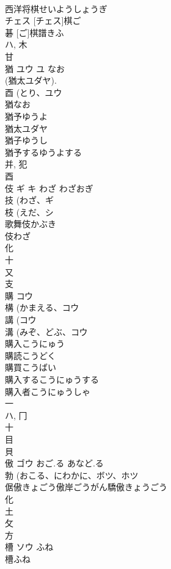\documentclass[8pt]{extreport}
\begin{document}
\begin{CJK}{UTF8}{min}
\\	西洋将棋せいようしょうぎ
\\	チェス [チェス]棋ご
\\	碁 [ご]棋譜きふ
\\	ハ, 木 
\\	甘 
\\	猶	ユウ ユ	なお	
\\	(猶太ユダヤ). 
\\	酉 (とり、ユウ 
\\	猶なお 
\\	猶予ゆうよ 
\\	猶太ユダヤ 
\\	猶子ゆうし 
\\	猶予するゆうよする 
\\	并, 犯 
\\	酉 
\\	伎	ギ キ	わざ わざおぎ	
\\	技 (わざ、ギ 
\\	枝 (えだ、シ 
\\	歌舞伎かぶき
\\	伎わざ
\\	化 
\\	十 
\\	又 
\\	支 
\\	購	コウ		
\\	構 (かまえる、コウ 
\\	講 (コウ 
\\	溝 (みぞ、どぶ、コウ 
\\	購入こうにゅう 
\\	購読こうどく 
\\	購買こうばい 
\\	購入するこうにゅうする 
\\	購入者こうにゅうしゃ 
\\	一 
\\	ハ, 冂 
\\	十 
\\	目 
\\	貝 
\\	傲	ゴウ	おご.る あなど.る	
\\	勃 (おこる、にわかに、ボツ、ホツ 
\\	倨傲きょごう傲岸ごうがん驕傲きょうごう
\\	化 
\\	土 
\\	攵 
\\	方 
\\	槽	ソウ	ふね	
\\	槽ふね 

\end{CJK}
\end{document}
